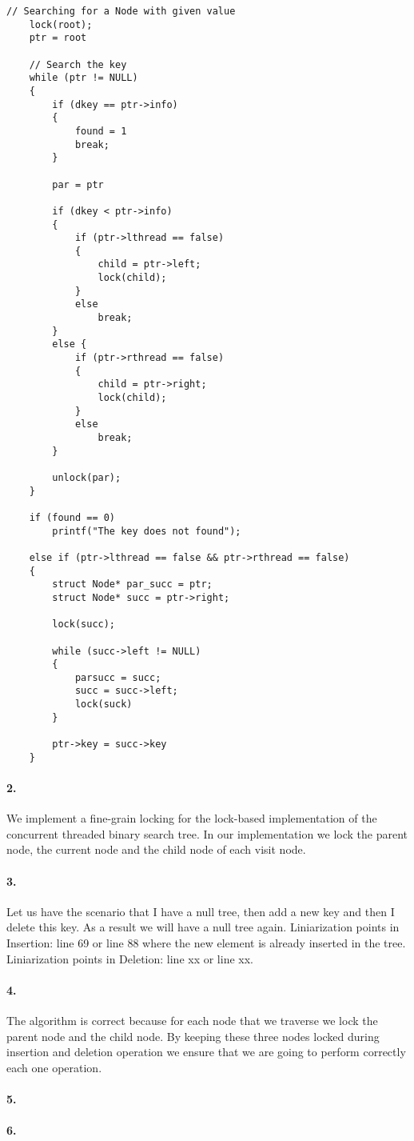 \begin{lstlisting}[style=mycode]
    // Searching for a Node with given value 
	lock(root);
	ptr = root

	// Search the key
    while (ptr != NULL) 
    { 
		if (dkey == ptr->info)
		{
			found = 1
			break;
		}

		par = ptr

		if (dkey < ptr->info)
		{
			if (ptr->lthread == false)
			{
				child = ptr->left;
				lock(child);
			}
			else
				break;
		}
		else {
			if (ptr->rthread == false)
			{
				child = ptr->right;
				lock(child);
			}
			else
				break;
		}

		unlock(par);
	} 

	if (found == 0)
		printf("The key does not found");

	else if (ptr->lthread == false && ptr->rthread == false)
	{
		struct Node* par_succ = ptr;
		struct Node* succ = ptr->right;

		lock(succ);

		while (succ->left != NULL)
		{
			parsucc = succ;
			succ = succ->left;
			lock(suck)
		}

		ptr->key = succ->key
	}

\end{lstlisting}

\paragraph{2.}
We implement a fine-grain locking for the lock-based implementation of
the concurrent threaded binary search tree. In our implementation we
lock the parent node, the current node and the child node of each
visit node.

\paragraph{3.}
Let us have the scenario that I have a null tree, then add a new key
and then I delete this key. As a result we will have a null tree
again.
Liniarization points in Insertion: line 69 or line 88 where the new
element is already inserted in the tree.
Liniarization points in Deletion: line xx or line xx.


\paragraph{4.}
The algorithm is correct because for each node that we traverse we
lock the parent node and the child node. By keeping these three nodes
locked during insertion and deletion operation we ensure that we are
going to perform correctly each one operation.

\paragraph{5.}


\paragraph{6.}
